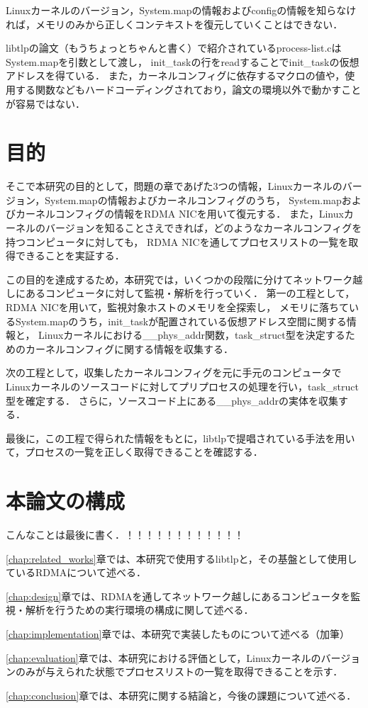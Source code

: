 
Linuxカーネルのバージョン，System.mapの情報およびconfigの情報を知らなければ，メモリのみから正しくコンテキストを復元していくことはできない．

libtlpの論文（もうちょっとちゃんと書く）で紹介されているprocess-list.cはSystem.mapを引数として渡し，
init_taskの行をreadすることでinit_taskの仮想アドレスを得ている．
また，カーネルコンフィグに依存するマクロの値や，使用する関数などもハードコーディングされており，論文の環境以外で動かすことが容易ではない．

\section{目的}
\label{section:purpose}

そこで本研究の目的として，問題の章であげた3つの情報，Linuxカーネルのバージョン，System.mapの情報およびカーネルコンフィグのうち，
System.mapおよびカーネルコンフィグの情報をRDMA NICを用いて復元する．
また，Linuxカーネルのバージョンを知ることさえできれば，どのようなカーネルコンフィグを持つコンピュータに対しても，
RDMA NICを通してプロセスリストの一覧を取得できることを実証する．

この目的を達成するため，本研究では，いくつかの段階に分けてネットワーク越しにあるコンピュータに対して監視・解析を行っていく．
第一の工程として，RDMA NICを用いて，監視対象ホストのメモリを全探索し，
メモリに落ちているSystem.mapのうち，init_taskが配置されている仮想アドレス空間に関する情報と，
Linuxカーネルにおける__phys_addr関数，task_struct型を決定するためのカーネルコンフィグに関する情報を収集する．

次の工程として，収集したカーネルコンフィグを元に手元のコンピュータでLinuxカーネルのソースコードに対してプリプロセスの処理を行い，task_struct型を確定する．
さらに，ソースコード上にある__phys_addrの実体を収集する．

最後に，この工程で得られた情報をもとに，libtlpで提唱されている手法を用いて，プロセスの一覧を正しく取得できることを確認する．

\section{本論文の構成}

こんなことは最後に書く．！！！！！！！！！！！！

\ref{chap:related_works}章では、本研究で使用するlibtlpと，その基盤として使用しているRDMAについて述べる．

\ref{chap:design}章では、RDMAを通してネットワーク越しにあるコンピュータを監視・解析を行うための実行環境の構成に関して述べる．

\ref{chap:implementation}章では、本研究で実装したものについて述べる（加筆）

\ref{chap:evaluation}章では、本研究における評価として，Linuxカーネルのバージョンのみが与えられた状態でプロセスリストの一覧を取得できることを示す．

\ref{chap:conclusion}章では、本研究に関する結論と，今後の課題について述べる．
